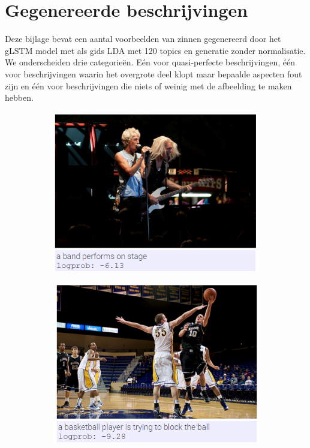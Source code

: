 \chapter{Gegenereerde beschrijvingen}
\label{app:generalResults}
Deze bijlage bevat een aantal voorbeelden van zinnen gegenereerd door het gLSTM model met als gids LDA met 120 topics en generatie zonder normalisatie. We onderscheiden drie categorie\"en. E\'en voor quasi-perfecte beschrijvingen, \'e\'en voor beschrijvingen waarin het overgrote deel klopt maar bepaalde aspecten fout zijn en \'e\'en voor beschrijvingen die niets of weinig met de afbeelding te maken hebben.
	\begin{figure}
		\begin{subfigure}{.5\textwidth}
			\centering
			\includegraphics[width=.8\linewidth]{Images/Results/Perfect/band_performs}
			\label{fig:perfectresults1}
		\end{subfigure}%
		\begin{subfigure}{.5\textwidth}
			\centering
			\includegraphics[width=.8\linewidth]{Images/Results/Perfect/blocking_the_ball}

\end{subfigure}
\end{figure}
